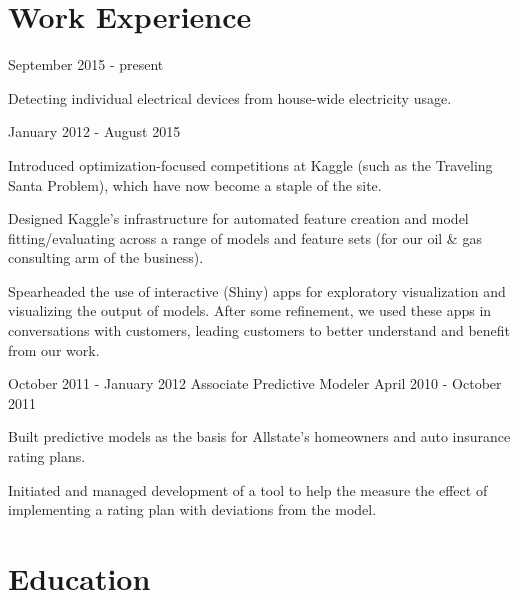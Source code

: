 \documentclass[letterpaper]{resume}
\author{David J. Chudzicki}
\begin{document}
\maketitle

\section{Work Experience}

{September 2015 - present}


\begin{compactitem}
\item Detecting individual electrical devices from house-wide electricity usage.
\end{compactitem}


{January 2012 - August 2015}            


\begin{compactitem}
\item Introduced optimization-focused competitions at Kaggle (such as the Traveling Santa Problem), which have now become a staple of the site.
\item Designed Kaggle's infrastructure for automated feature creation and model fitting/evaluating across a range of models and feature sets (for our oil \& gas consulting arm of the business).
\item Spearheaded the use of interactive (Shiny) apps for exploratory visualization and visualizing the output of models. After some refinement, we used these apps in conversations with customers, leading customers to better understand and benefit from our work.
\end{compactitem}


{October 2011 - January 2012}
{Associate Predictive Modeler}
{April 2010 - October 2011}


\begin{compactitem}
\item Built predictive models as the basis for Allstate's homeowners and auto insurance rating plans.
\item Initiated and managed development of a tool to help the measure the effect of implementing a rating plan with deviations from the model.
\end{compactitem}

\section{Education}
\end{document}

